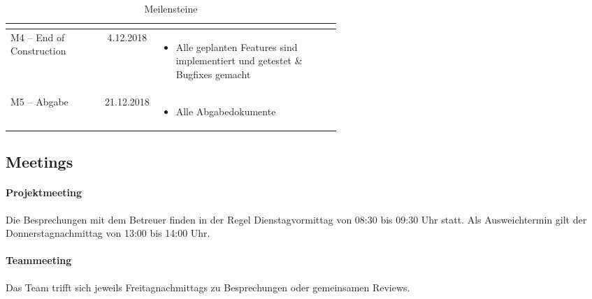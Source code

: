 \begin{table}[H]
\begin{tabular}{|l|c|p{0.55\linewidth}|}
\begin{itemize}
        \end{itemize} \\ \hline
        M4 – End of Construction & 4.12.2018 &
        \vspace{-7mm}
        \begin{itemize}
            \setlength\itemsep{0mm}
            \item Alle geplanten Features sind implementiert und getestet \& Bugfixes gemacht
            \vspace{-\topsep}
        \end{itemize} \\ \hline
        M5 – Abgabe & 21.12.2018 & 
        \vspace{-7mm}
        \begin{itemize}
            \setlength\itemsep{0mm}
            \item Alle Abgabedokumente
            \vspace{-\topsep}
        \end{itemize} \\ \hline

    \end{tabular}
    \caption{Meilensteine}
\end{table}


\subsection{Meetings}
\paragraph{Projektmeeting}
Die Besprechungen mit dem Betreuer finden in der Regel Dienstagvormittag von 08:30 bis 09:30 Uhr statt. Als Ausweichtermin gilt der Donnerstagnachmittag von 13:00 bis 14:00 Uhr.
\paragraph{Teammeeting}
Das Team trifft sich jeweils Freitagnachmittags zu Besprechungen oder gemeinsamen Reviews.